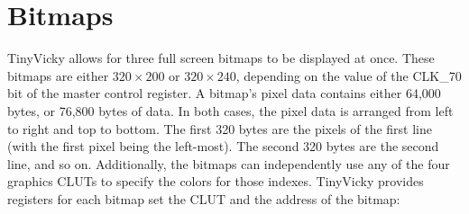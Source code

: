 \section{Bitmaps}

TinyVicky allows for three full screen bitmaps to be displayed at once. These bitmaps are either $320 \times 200$ or $320 \times 240$, depending on the value of the CLK\_70 bit of the master control register. A bitmap's pixel data contains either 64,000 bytes, or 76,800 bytes of data. In both cases, the pixel data is arranged from left to right and top to bottom. The first 320 bytes are the pixels of the first line (with the first pixel being the left-most). The second 320 bytes are the second line, and so on. Additionally, the bitmaps can independently use any of the four graphics CLUTs to specify the colors for those indexes. TinyVicky provides registers for each bitmap set the CLUT and the address of the bitmap:

